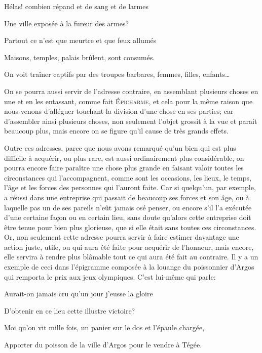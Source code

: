 \begin{emphpar}
  Hélas! combien répand et de sang et de larmes

  Une ville exposée à la fureur des armes?

  Partout ce n'est que meurtre et que feux allumés

  Maisons, temples, palais brûlent, sont consumés.

  On voit traîner captifs par des troupes barbares, femmes, filles, enfants\dots
\end{emphpar}

\bigbreak

On se pourra aussi servir de l'adresse contraire, en assemblant plusieurs choses en une et en les entassant, comme fait
\textsc{Épicharme}, et cela pour la même raison que nous venons d'alléguer touchant la division d'une chose en ses
parties; car d'assembler ainsi plusieurs choses, non seulement l'objet grossit à la vue et parait beaucoup plus, mais
encore on se figure qu'il cause de très grands effets. 

\bigbreak

Outre ces adresses, parce que nous avons remarqué qu'un bien qui est plus difficile à acquérir, ou plus rare, est aussi
ordinairement plus considérable, on pourra encore faire paraître une chose plus grande en faisant valoir toutes les circonstances
qui l’accompagnent, comme sont les occasions, les lieux, le temps, l'âge et les forces des personnes qui l'auront faite. Car
si quelqu'un, par exemple, a réussi dans une entreprise qui passait de beaucoup ses forces et son âge, ou à laquelle pas un
de ses pareils n'eût jamais osé penser, ou encore s'il l'a exécutée d'une certaine façon ou en certain lieu, sans doute
qu'alors cette entreprise doit être tenue pour bien plus glorieuse, que si elle était sans toutes ces circonstances. Or, non
seulement cette adresse pourra servir à faire estimer davantage une action juste, utile, ou qui aura été faite pour acquérir
de l'honneur, mais encore, elle servira à rendre plus blâmable tout ce qui aura été fait au contraire. Il y a un exemple de
ceci dans l'épigramme composée à la louange du poissonnier d'Argos qui remporta le prix aux jeux olympiques. C'est lui-même
qui parle:

\begin{emphpar}
  Aurait-on jamais cru qu'un jour j'eusse la gloire

  D'obtenir en ce lieu cette illustre victoire?

  Moi qu'on vit mille fois, un panier sur le dos et l'épaule chargée,

  Apporter du poisson de la ville d'Argos pour le vendre à Tégée.
\end{emphpar}


